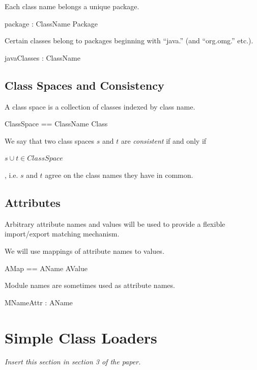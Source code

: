 \documentclass[a4paper,9pt]{article}
\begin{document}
Each class name belongs a unique package.
\begin{axdef}
  package : ClassName \fun Package
\end{axdef}

Certain classes belong to packages beginning with ``java.'' (and ``org.omg.'' etc.).
\begin{axdef}
  javaClasses : \power ClassName
\end{axdef}

\subsection*{Class Spaces and Consistency}

A class space is a collection of classes indexed by class name.
\begin{zed}
  ClassSpace == ClassName \pinj Class
\end{zed}

We say that two class spaces $s$ and $t$ are \textit{consistent} if
and only if

$s \cup t \in ClassSpace$

, i.e. $s$ and $t$ agree on the
class names they have in common.

\subsection*{Attributes}

Arbitrary attribute names and values will be used to provide a flexible
import/export matching mechanism.
\begin{zed}
\end{zed}

We will use mappings of attribute names to values.
\begin{zed}
  AMap == AName \pfun AValue
\end{zed}

Module  names are sometimes used as attribute names.
\begin{axdef}
  MNameAttr : AName
\end{axdef}

\clearpage
\section{Simple Class Loaders}
\label{cha:simpleloaders}
\textit{Insert this section in section 3 of the paper.}
\end{document}

